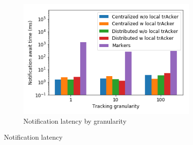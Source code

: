 \begin{figure}[t!]
\begin{subfigure}[b]{0.32\textwidth}
            \includegraphics[width=0.99\textwidth]{pics/notification_await_time_by_tracking_frequency_bars.png}
            \caption{Notification latency by granularity}
            \label{notification_granularity}
	\end{subfigure}
    \caption{Notification latency}
    \label{notification_latency}
\end{figure}

